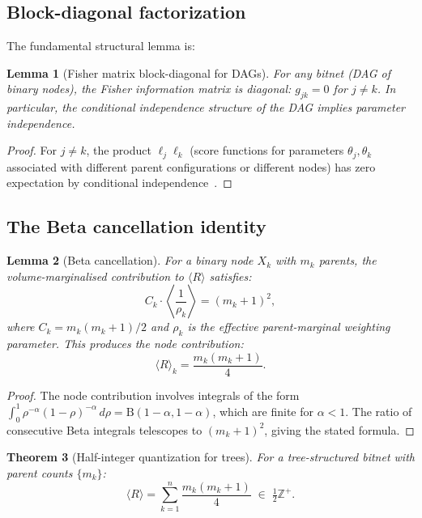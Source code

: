 \documentclass[11pt]{article}
\newtheorem{theorem}{Theorem}[section]
\newtheorem{lemma}[theorem]{Lemma}
\theoremstyle{definition}
\begin{document}
\subsection{Block-diagonal factorization}

The fundamental structural lemma is:

\begin{lemma}[Fisher matrix block-diagonal for DAGs]\label{lem:block_diag}
For any bitnet (DAG of binary nodes), the Fisher information matrix is diagonal:
$g_{jk}=0$ for $j \neq k$.  In particular, the conditional independence 
structure of the DAG implies parameter independence.
\end{lemma}

\begin{proof}
For $j \neq k$, the product $\ell_j\ell_k$ (score functions for parameters 
$\theta_j,\theta_k$ associated with different parent configurations or 
different nodes) has zero expectation by conditional independence~\cite{Rod04}.
\end{proof}

\subsection{The Beta cancellation identity}

\begin{lemma}[Beta cancellation]\label{lem:beta}
For a binary node $X_k$ with $m_k$ parents, the volume-marginalised 
contribution to $\langle R\rangle$ satisfies:
\[
  C_k \cdot \left\langle \frac{1}{\rho_k} \right\rangle = (m_k+1)^2,
\]
where $C_k = m_k(m_k+1)/2$ and $\rho_k$ is the effective parent-marginal 
weighting parameter.  This produces the node contribution:
\[
  \langle R\rangle_k = \frac{m_k(m_k+1)}{4}.
\]
\end{lemma}

\begin{proof}
The node contribution involves integrals of the form 
$\int_0^1 \rho^{-\alpha}(1-\rho)^{-\alpha}\,d\rho = \mathrm{B}(1-\alpha,1-\alpha)$, 
which are finite for $\alpha < 1$.  The ratio of consecutive Beta 
integrals telescopes to $(m_k+1)^2$, giving the stated formula.
\end{proof}

\begin{theorem}[Half-integer quantization for trees]\label{thm:trees}
For a tree-structured bitnet with parent counts $\{m_k\}$:
\begin{equation}\label{eq:tree_R}
  \langle R\rangle = \sum_{k=1}^n \frac{m_k(m_k+1)}{4} \;\in\; \tfrac{1}{2}\mathbb{Z}^+.
\end{equation}
\end{theorem}
\end{document}
